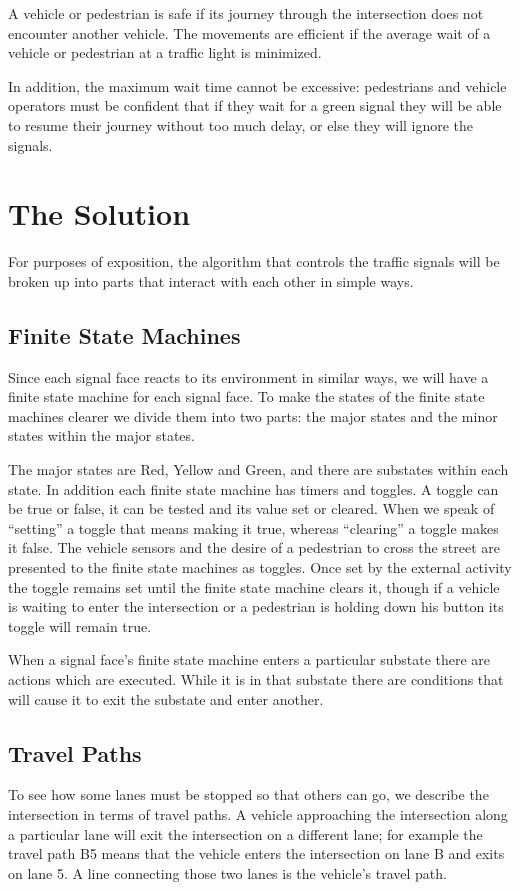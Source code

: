 \documentclass[letterpaper,twoside]{article}
\begin{document}
A vehicle or pedestrian is safe if its journey through the intersection
does not encounter another vehicle.  The movements are efficient if the
average wait of a vehicle or pedestrian at a traffic light is minimized.

In addition, the maximum wait time cannot be excessive: pedestrians and
vehicle operators must be confident that if they wait for a green signal
they will be able to resume their journey without too much delay, or
else they will ignore the signals.

\section{The Solution}
For purposes of exposition, the algorithm that controls the traffic
signals will be broken up into parts that interact with each other
in simple ways.

\subsection{Finite State Machines}
Since each signal face reacts to its environment in similar ways,
we will have a finite state machine for each signal face.
To make the states of the finite state machines clearer we divide them into
two parts: the major states and the minor states within the major states.

The major states are Red,
Yellow and Green, and there are substates within each state.  In addition
each finite state machine has timers and toggles.
A toggle can be true or false,
it can be tested and its value set or cleared.
When we speak of ``setting'' a toggle
that means making it true, whereas ``clearing'' a toggle makes it false.
The vehicle sensors and the desire of a pedestrian
to cross the street are presented to the finite state machines as toggles.
Once set by
the external activity the toggle remains set until the finite state machine
clears it, though if a vehicle is waiting to enter the
intersection or a pedestrian is holding down his button its toggle will
remain true.

When a signal face's finite state machine enters a particular substate
there are actions
which are executed.  While it is in that substate there are conditions
that will cause it to exit the substate and enter another.

\subsection{Travel Paths}
To see how some lanes must be stopped so that others can go, we describe
the intersection in terms of travel paths.  A vehicle approaching the
intersection along a particular lane will exit the intersection on a
different lane; for example the travel path B5 means that the vehicle enters
the intersection on lane B and exits on lane 5.
A line connecting those two lanes is the vehicle's
travel path.
\end{document}
